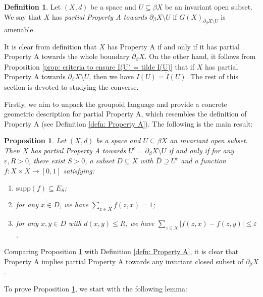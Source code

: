 \documentclass[12pt, a4paper]{amsart}
\numberwithin{equation}{section}
\newtheorem{prop}[thm]{Proposition}
\theoremstyle{definition}
\newtheorem{defn}[thm]{Definition}
\theoremstyle{remark}
\def\supp{\mathrm{supp}}
\begin{document}
\begin{defn}\label{defn:partial Property A}
Let $(X,d)$ be a space and $U \subseteq \beta X$ be an invariant open subset. We say that $X$ has \emph{partial Property A towards $\partial_\beta X \setminus U$} if $G(X)_{\partial_\beta X \setminus U}$ is amenable.
\end{defn}

It is clear from definition that $X$ has Property A if and only if it has partial Property A towards the whole boundary $\partial_\beta X$. On the other hand, it follows from Proposition \ref{prop: criteria to ensure I(U) = tilde I(U)} that if $X$ has partial Property A towards $\partial_\beta X \setminus U$, then we have $I(U) = \tilde{I}(U)$. The rest of this section is devoted to studying the converse.

Firstly, we aim to unpack the groupoid language and provide a concrete geometric description for partial Property A, which resembles the definition of Property A (see Definition \ref{defn: Property A}). The following is the main result:

\begin{prop}\label{prop:char for partial A}
Let $(X,d)$ be a space and $U \subseteq \beta X$ an invariant open subset. Then $X$ has partial Property A towards $U^c=\partial_\beta X \setminus U$ \emph{if and only if} for any $\varepsilon, R>0$, there exist $S>0$, a subset $D \subseteq X$ with $\overline{D} \supseteq U^c$ and a function $f: X \times X \to [0,1]$ satisfying:
\begin{enumerate}
  \item $\supp(f) \subseteq E_S$;
  \item for any $x\in D$, we have $\sum_{z\in X} f(z,x) =1$;
  \item for any $x, y\in D$ with $d(x,y) \leq R$, we have $\sum_{z\in X} |f(z,x) - f(z,y)| \leq \varepsilon$.
\end{enumerate}
\end{prop}

Comparing Proposition \ref{prop:char for partial A} with Definition \ref{defn: Property A}, it is clear that Property A implies partial Property A towards any invariant closed subset of $\partial_\beta X$.

To prove Proposition \ref{prop:char for partial A}, we start with the following lemma:
\end{document}
